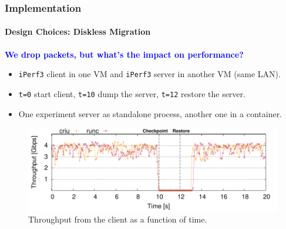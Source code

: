 \documentclass[9pt,    %
    english,            %
    xcolor=table,       %
    envcountsect,        %
    aspectratio=169     %
]{beamer}
\begin{document}
\begin{frame}
    \frametitle{Implementation}
    \framesubtitle{Design Choices: Diskless Migration}

    \vspace{10pt}

    \textbf{\textcolor{blue}{We drop packets, but what's the impact on performance?}}
    \begin{itemize}
        \item \texttt{iPerf3} client in one VM and \texttt{iPerf3} server in another VM (same LAN).
        \item \texttt{t=0} start client, \texttt{t=10} dump the server, \texttt{t=12} restore the server.
        \item One experiment server as standalone process, another one in a container.
    \end{itemize}

    \vspace{-5pt}

    \begin{figure}
        \centering
        \includegraphics[width=.75\textwidth]{./images/tcp_established_downtime_microbenchmark.pdf}
        \caption{Throughput from the client as a function of time.\label{fig:evaluation-downtime}}
    \end{figure}
    
\end{frame}
\end{document}
